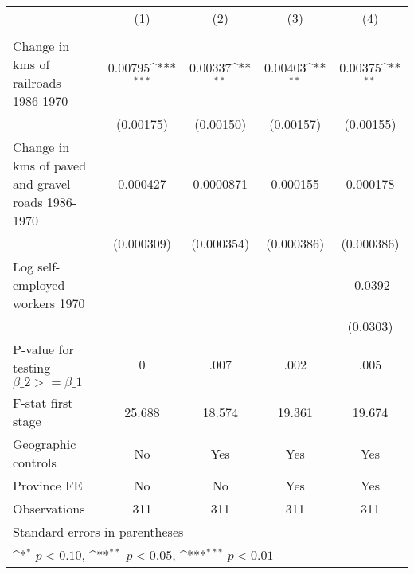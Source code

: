 {
\def\sym#1{\ifmmode^{#1}\else\(^{#1}\)\fi}
\begin{tabular}{l*{4}{c}}
\hline\hline
                &\multicolumn{1}{c}{(1)}&\multicolumn{1}{c}{(2)}&\multicolumn{1}{c}{(3)}&\multicolumn{1}{c}{(4)}\\
                &\multicolumn{1}{c}{}&\multicolumn{1}{c}{}&\multicolumn{1}{c}{}&\multicolumn{1}{c}{}\\
\hline
Change in kms of railroads 1986-1970&  0.00795\sym{***}&  0.00337\sym{**} &  0.00403\sym{**} &  0.00375\sym{**} \\
                &(0.00175)         &(0.00150)         &(0.00157)         &(0.00155)         \\
[1em]
Change in kms of paved and gravel roads 1986-1970& 0.000427         &0.0000871         & 0.000155         & 0.000178         \\
                &(0.000309)         &(0.000354)         &(0.000386)         &(0.000386)         \\
[1em]
Log self-employed workers 1970&                  &                  &                  &  -0.0392         \\
                &                  &                  &                  & (0.0303)         \\
\hline
P-value for testing $\beta\_{2} >= \beta\_{1}$&        0         &     .007         &     .002         &     .005         \\
F-stat first stage&   25.688         &   18.574         &   19.361         &   19.674         \\
Geographic controls&       No         &      Yes         &      Yes         &      Yes         \\
Province FE     &       No         &       No         &      Yes         &      Yes         \\
Observations    &      311         &      311         &      311         &      311         \\
\hline\hline
\multicolumn{5}{l}{\footnotesize Standard errors in parentheses}\\
\multicolumn{5}{l}{\footnotesize \sym{*} \(p<0.10\), \sym{**} \(p<0.05\), \sym{***} \(p<0.01\)}\\
\end{tabular}
}
